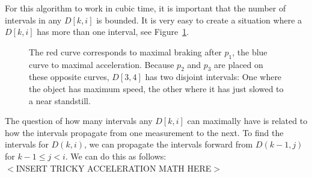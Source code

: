 \documentclass{article}
\begin{document}
For this algorithm to work in cubic time, it is important that the number of intervals in any \(D[k,i]\) is bounded. It is very easy to create a situation where a \(D[k,i]\) has more than one interval, see Figure~\ref{fig:twointervals}.

\begin{figure}
    \centering
    \caption{The red curve corresponds to maximal braking after \(p_1\), the blue curve to maximal acceleration. Because \(p_2\) and \(p_3\) are placed on these opposite curves, \(D[3,4]\) has two disjoint intervals: One where the object has maximum speed, the other where it has just slowed to a near standstill.}
    \label{fig:twointervals}
\end{figure}

The question of how many intervals any \(D[k,i]\) can maximally have is related to how the intervals propagate from one measurement to the next. To find the intervals for \(D(k,i)\), we can propagate the intervals forward from \(D(k-1,j)\) for \(k-1 \leq j < i\). We can do this as follows:\\ \(<\)INSERT TRICKY ACCELERATION MATH HERE\(>\)
\end{document}
